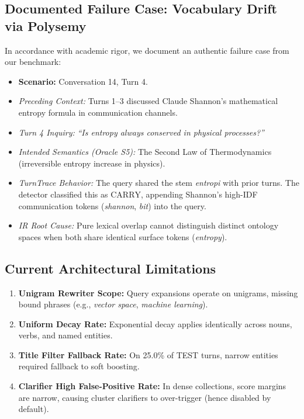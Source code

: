 \documentclass[10pt,a4paper,twocolumn]{article}
\begin{document}
\subsection{Documented Failure Case: Vocabulary Drift via Polysemy}
In accordance with academic rigor, we document an authentic failure case from our benchmark:
\begin{itemize}
    \item \textbf{Scenario:} Conversation 14, Turn 4.
    \item \textit{Preceding Context:} Turns 1--3 discussed Claude Shannon's mathematical entropy formula in communication channels.
    \item \textit{Turn 4 Inquiry:} \textit{``Is entropy always conserved in physical processes?''}
    \item \textit{Intended Semantics (Oracle S5):} The Second Law of Thermodynamics (irreversible entropy increase in physics).
    \item \textit{TurnTrace Behavior:} The query shared the stem \textit{entropi} with prior turns. The detector classified this as $\text{CARRY}$, appending Shannon's high-IDF communication tokens (\textit{shannon}, \textit{bit}) into the query.
    \item \textit{IR Root Cause:} Pure lexical overlap cannot distinguish distinct ontology spaces when both share identical surface tokens (\textit{entropy}).
\end{itemize}

\subsection{Current Architectural Limitations}
\begin{enumerate}
    \item \textbf{Unigram Rewriter Scope:} Query expansions operate on unigrams, missing bound phrases (e.g., \textit{vector space}, \textit{machine learning}).
    \item \textbf{Uniform Decay Rate:} Exponential decay applies identically across nouns, verbs, and named entities.
    \item \textbf{Title Filter Fallback Rate:} On 25.0\% of TEST turns, narrow entities required fallback to soft boosting.
    \item \textbf{Clarifier High False-Positive Rate:} In dense collections, score margins are narrow, causing cluster clarifiers to over-trigger (hence disabled by default).
\end{enumerate}
\end{document}
